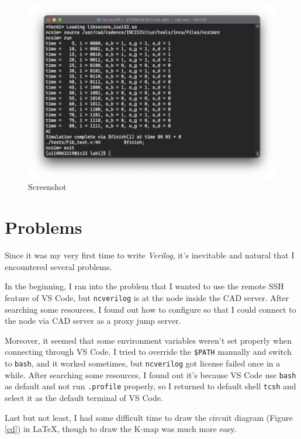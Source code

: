 \documentclass[12pt, a4paper]{article}
\begin{document}
\begin{figure}[htbp]
\begin{center}
\centering
\includegraphics[width=\textwidth]{screenshot}
\caption{Screenshot}
\label{ss}
\end{center}
\end{figure}

\section{Problems}

Since it was my very first time to write \textit{Verilog}, it's inevitable and natural that I encountered several problems.

In the beginning, I ran into the problem that I wanted to use the remote SSH feature of VS Code, but \texttt{ncverilog} is at the node inside the CAD server. After searching some resources, I found out how to configure so that I could connect to the node via CAD server as a proxy jump server.

Moreover, it seemed that some environment variables weren't set properly when connecting through VS Code. I tried to override the \texttt{\$PATH} manually and switch to \texttt{bash}, and it worked sometimes, but \texttt{ncverilog} got license failed once in a while. After searching some resources, I found out it's because VS Code use \texttt{bash} as default and not run \texttt{.profile} properly, so I returned to default shell \texttt{tcsh} and select it as the default terminal of VS Code.

Last but not least, I had some difficult time to draw the circuit diagram (Figure \ref{cd}) in \LaTeX, though to draw the K-map was much more easy.
\end{document}
